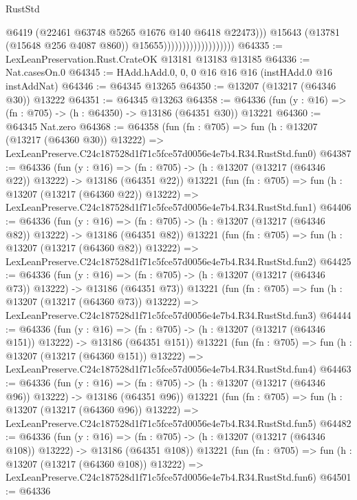 \begin{lexlean}{RustStd}
\begin{coremodule}
                                              @6419
                                              (@22461 @63748 @5265 @1676 @140 @6418 @22473)))
                                          @15643
                                          (@13781 (@15648 @256 @4087 @860))
                                          @15655)))))))))))))))))))
@64335 := LexLeanPreservation.Rust.CrateOK @13181 @13183 @13185
@64336 := Nat.casesOn.{0}
@64345 := HAdd.hAdd.{0, 0, 0} @16 @16 @16 (instHAdd.{0} @16 instAddNat)
@64346 := @64345 @13265
@64350 := @13207 (@13217 (@64346 @30)) @13222
@64351 := @64345 @13263
@64358 := @64336 (fun (y : @16) => (fn : @705) -> (h : @64350) -> @13186 (@64351 @30)) @13221
@64360 := @64345 Nat.zero
@64368 := @64358
    (fun (fn : @705) =>
    fun (h : @13207 (@13217 (@64360 @30)) @13222) =>
    LexLeanPreserve.C24c187528d1f71c5fce57d0056e4e7b4.R34.RustStd.fun0)
@64387 := @64336
    (fun (y : @16) =>
    (fn : @705) -> (h : @13207 (@13217 (@64346 @22)) @13222) -> @13186 (@64351 @22))
    @13221
    (fun (fn : @705) =>
    fun (h : @13207 (@13217 (@64360 @22)) @13222) =>
    LexLeanPreserve.C24c187528d1f71c5fce57d0056e4e7b4.R34.RustStd.fun1)
@64406 := @64336
    (fun (y : @16) =>
    (fn : @705) -> (h : @13207 (@13217 (@64346 @82)) @13222) -> @13186 (@64351 @82))
    @13221
    (fun (fn : @705) =>
    fun (h : @13207 (@13217 (@64360 @82)) @13222) =>
    LexLeanPreserve.C24c187528d1f71c5fce57d0056e4e7b4.R34.RustStd.fun2)
@64425 := @64336
    (fun (y : @16) =>
    (fn : @705) -> (h : @13207 (@13217 (@64346 @73)) @13222) -> @13186 (@64351 @73))
    @13221
    (fun (fn : @705) =>
    fun (h : @13207 (@13217 (@64360 @73)) @13222) =>
    LexLeanPreserve.C24c187528d1f71c5fce57d0056e4e7b4.R34.RustStd.fun3)
@64444 := @64336
    (fun (y : @16) =>
    (fn : @705) -> (h : @13207 (@13217 (@64346 @151)) @13222) -> @13186 (@64351 @151))
    @13221
    (fun (fn : @705) =>
    fun (h : @13207 (@13217 (@64360 @151)) @13222) =>
    LexLeanPreserve.C24c187528d1f71c5fce57d0056e4e7b4.R34.RustStd.fun4)
@64463 := @64336
    (fun (y : @16) =>
    (fn : @705) -> (h : @13207 (@13217 (@64346 @96)) @13222) -> @13186 (@64351 @96))
    @13221
    (fun (fn : @705) =>
    fun (h : @13207 (@13217 (@64360 @96)) @13222) =>
    LexLeanPreserve.C24c187528d1f71c5fce57d0056e4e7b4.R34.RustStd.fun5)
@64482 := @64336
    (fun (y : @16) =>
    (fn : @705) -> (h : @13207 (@13217 (@64346 @108)) @13222) -> @13186 (@64351 @108))
    @13221
    (fun (fn : @705) =>
    fun (h : @13207 (@13217 (@64360 @108)) @13222) =>
    LexLeanPreserve.C24c187528d1f71c5fce57d0056e4e7b4.R34.RustStd.fun6)
@64501 := @64336

\end{coremodule}
\end{lexlean}
